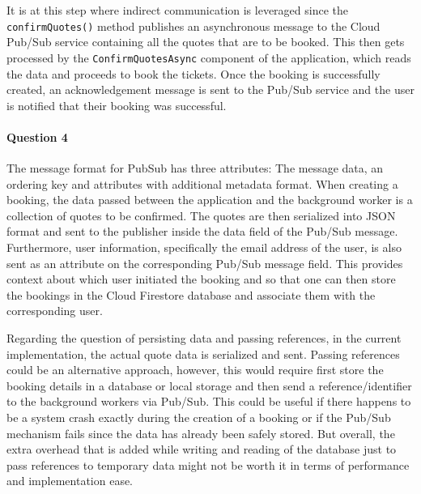 \documentclass{ds-report}
\begin{document}
    It is at this step where indirect communication is leveraged since the \texttt{confirmQuotes()} method publishes an asynchronous message to the Cloud Pub/Sub service containing all the quotes that are to be booked. This then gets processed by the \texttt{ConfirmQuotesAsync} component of the application, which reads the data and proceeds to book the tickets. Once the booking is successfully created, an acknowledgement message is sent to the Pub/Sub service and the user is notified that their booking was successful.

    \paragraph{Question 4} 
The message format for PubSub has three attributes: The message data, an ordering key and attributes with additional metadata format. When creating a booking, the data passed between the application and the background worker is a collection of quotes to be confirmed. The quotes are then serialized into JSON format and sent to the publisher inside the data field of the Pub/Sub message. Furthermore, user information, specifically the email address of the user, is also sent as an attribute on the corresponding Pub/Sub message field. This provides context about which user initiated the booking and so that one can then store the bookings in the Cloud Firestore database and associate them with the corresponding user.

Regarding the question of persisting data and passing references, in the current implementation, the actual quote data is serialized and sent. Passing references could be an alternative approach, however, this would require first store the booking details in a database or local storage and then send a reference/identifier to the background workers via Pub/Sub. This could be useful if there happens to be a system crash exactly during the creation of a booking or if the Pub/Sub mechanism fails since the data has already been safely stored. But overall, the extra overhead that is added while writing and reading of the database just to pass references to temporary data might not be worth it in terms of performance and implementation ease.

\end{document}
